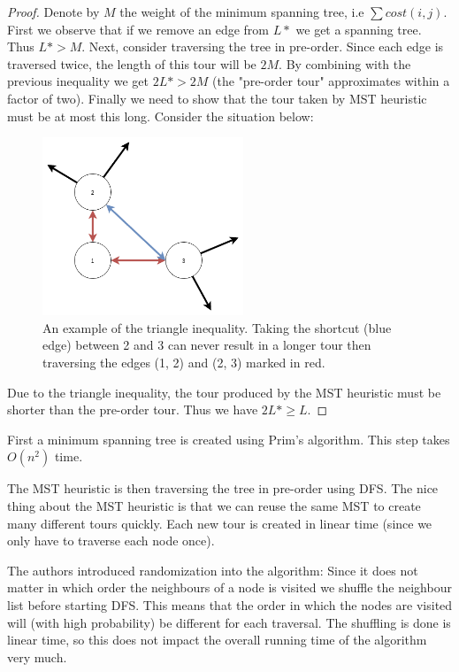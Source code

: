 \documentclass{report}
\begin{document}
\begin{proof}
Denote by $M$ the weight of the minimum spanning tree, i.e $\sum cost(i, j)$. First we observe that if we remove an edge from $L*$ we get a spanning tree. Thus $L* > M$. Next, consider traversing the tree in pre-order. Since each edge is traversed twice, the length of this tour will be $2M$. By combining with the previous inequality we get $2L* > 2M$ (the "pre-order tour" approximates within a factor of two). Finally we need to show that the tour taken by MST heuristic must be at most this long. Consider the situation below:
\begin{figure}[ht]
\centering
\includegraphics[width=60mm]{TriangleInequality}
\caption{An example of the triangle inequality. Taking the shortcut (blue edge) between 2 and 3 can never result in a longer tour then traversing the edges (1, 2) and (2, 3) marked in red.}
\end{figure}
Due to the triangle inequality, the tour produced by the MST heuristic must be shorter than the pre-order tour. Thus we have $2L* \ge L$.
\end{proof}

First a minimum spanning tree is created using Prim's algorithm. This step takes $O(n^2)$ time.

The MST heuristic is then traversing the tree in pre-order using DFS. The nice thing about the MST heuristic is that we can reuse the same MST to create many different tours quickly. Each new tour is created in linear time (since we only have to traverse each node once). 

The authors introduced randomization into the algorithm: Since it does not matter in which order the neighbours of a node is visited we shuffle the neighbour list before starting DFS. This means that the order in which the nodes are visited will (with high probability) be different for each traversal. The shuffling is done is linear time, so this does not impact the overall running time of the algorithm very much.
\end{document}
